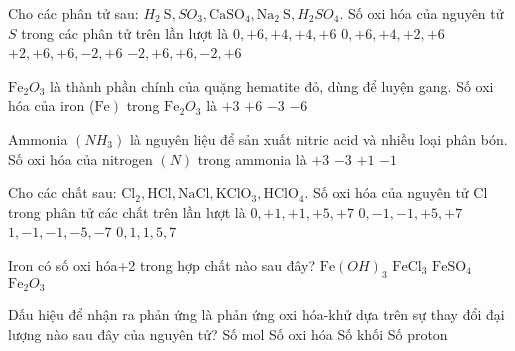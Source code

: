 \begin{ex}Cho các phân tử sau: $H_2\mathrm{~S}, SO_3, \mathrm{CaSO}_4, \mathrm{Na}_2\mathrm{~S}, H_2SO_4$. Số oxi hóa của nguyên tử $S$ trong các phân tử trên lần lượt là
	\choice
	{$0,+6,+4,+4,+6$}
	{$0,+6,+4,+2,+6$}
	{$+2,+6,+6,-2,+6$}
	{\True $-2,+6,+6,-2,+6$}
	\loigiai{}
\end{ex}

\begin{ex}$\mathrm{Fe}_2O_3$ là thành phần chính của quặng hematite đỏ, dùng để luyện gang. Số oxi hóa của iron ($\left.\mathrm{Fe}\right)$ trong $\mathrm{Fe}_2O_3$ là
	\choice
	{\True $+3$}
	{$+6$}
	{$-3$}
	{$-6$}
	\loigiai{}
\end{ex}

\begin{ex}Ammonia $\left(NH_3\right)$ là nguyên liệu để sản xuất nitric acid và nhiều loại phân bón. Số oxi hóa của nitrogen $(N)$ trong ammonia là
	\choice
	{$+3$}
	{\True $-3$}
	{$+1$}
	{$-1$}
	\loigiai{}
\end{ex}

\begin{ex}Cho các chất sau: $\mathrm{Cl}_2, \mathrm{HCl}, \mathrm{NaCl}, \mathrm{KClO}_3, \mathrm{HClO}_4$. Số oxi hóa của nguyên tử $\mathrm{Cl}$ trong phân tử các chất trên lần lượt là
	\choice
	{$0,+1,+1,+5,+7$}
	{\True $0,-1,-1,+5,+7$}
	{$1,-1,-1,-5,-7$}
	{$0,1,1,5,7$}
	\loigiai{}
\end{ex}

\begin{ex}Iron có số oxi hóa+2 trong hợp chất nào sau đây?
	\choice
	{$\mathrm{Fe}(OH)_3$}
	{$\mathrm{FeCl}_3$}
	{\True $\mathrm{FeSO}_4$}
	{$\mathrm{Fe}_2O_3$}
	\loigiai{}
\end{ex}

\begin{ex}Dấu hiệu để nhận ra phản ứng là phản ứng oxi hóa-khử dựa trên sự thay đổi đại lượng nào sau đây của nguyên tử?
	\choice
	{Số mol}
	{\True Số oxi hóa}
	{Số khối}
	{Số proton}
	\loigiai{}
\end{ex}


